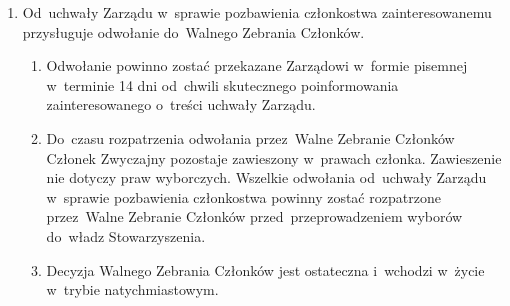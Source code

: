 \documentclass{article}
\begin{document}
\begin{enumerate}
\begin{enumerate}
        \item Zarząd może delegować zadania opisane w~\ref{przed-usunieciem-czlonka-1} i~\ref{przed-usunieciem-czlonka-2}.
      \end{enumerate}
      \item Od~uchwały Zarządu w~sprawie pozbawienia członkostwa zainteresowanemu przysługuje odwołanie do~Walnego Zebrania Członków.
      \begin{enumerate}
        \item Odwołanie powinno zostać przekazane Zarządowi w~formie pisemnej w~terminie 14 dni od~chwili skutecznego poinformowania zainteresowanego o~treści uchwały Zarządu.
        \item Do~czasu rozpatrzenia odwołania przez~Walne Zebranie Członków Członek Zwyczajny pozostaje zawieszony w~prawach członka. Zawieszenie nie dotyczy praw wyborczych. Wszelkie odwołania od~uchwały Zarządu w~sprawie pozbawienia członkostwa powinny zostać rozpatrzone przez~Walne Zebranie Członków przed~przeprowadzeniem wyborów do~władz Stowarzyszenia.
        \item Decyzja Walnego Zebrania Członków jest ostateczna i~wchodzi w~życie w~trybie natychmiastowym.
      \end{enumerate}
  \end{enumerate}
\end{document}
